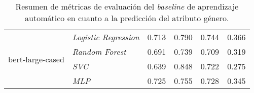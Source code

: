 \begin{table}[htpb]
{\begin{tabular}{llcccc}
        \midrule\midrule
        \multirow{4}{*}{bert-large-cased}   & \emph{Logistic Regression}  & 0.713 & 0.790 & 0.744 & 0.366\\
        \cmidrule{2-6}
                                            & \emph{Random Forest}        & 0.691 & 0.739 & 0.709 & 0.319\\
        \cmidrule{2-6}
                                            & \emph{SVC}                  & 0.639 & 0.848 & 0.722 & 0.275\\
        \cmidrule{2-6}
                                            & \emph{MLP}                  & 0.725 & 0.755 & 0.728 & 0.345\\
        \bottomrule
        \end{tabular}}
    \caption{Resumen de m\'etricas de evaluaci\'on del \emph{baseline} de aprendizaje autom\'atico en cuanto a la predicci\'on del atributo g\'enero.}
    \label{table:eval_baseline1_gender}
\end{table}

